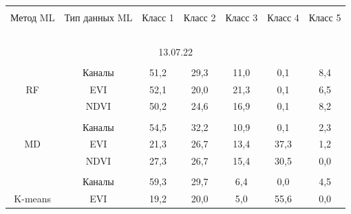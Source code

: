 \begin{table}\small %

\begin{center}


\vspace*{2ex}



\begin{tabular}{|c|c|c|c|c|c|c|}

\hline

&&&&&&\\[-10pt]

Метод ML&Тип данных ML&Класс 1&Класс 2&Класс 3&Класс 4&Класс 5\\

\hline

\multicolumn{7}{|c|}{\ }\\[-10pt]

\multicolumn{7}{|c|}{13.07.22}\\

\hline

&&&&&&\\[-10pt]

&Каналы&51,2&29,3&11,0&0,1&8,4\\

RF&EVI&52,1&20,0&21,3&0,1&6,5\\

&NDVI&50,2&24,6&16,9&0,1&8,2\\

\hline

&&&&&&\\[-10pt]

&Каналы&54,5&32,2&10,9&0,1&2,3\\

MD&EVI&21,3&26,7&13,4&37,3\hphantom{9}&1,2\\

&NDVI&27,3&26,7&15,4&30,5\hphantom{9}&0,0\\

\hline

&&&&&&\\[-10pt]

&Каналы&59,3&29,7&\hphantom{9}6,4&0,0&4,5\\

K-means&EVI&19,2&20,0&\hphantom{9}5,0&55,6\hphantom{9}&0,0\\


\end{tabular}
\end{center}
\end{table}
